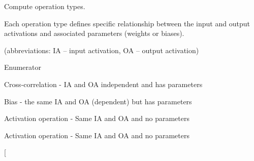 Compute operation types. 

Each operation type defines specific relationship between the input and output activations and associated parameters (weights or biases).\par
 (abbreviations\-: I\-A – input activation, O\-A – output activation) \begin{Desc}
\item[Enumerator]\par
\begin{description}
\item[{\em 
\hypertarget{namespaceMLSL_a1366e5621278eafc7ecb03de012824bfa70295c28704cb7c887a072686c4f5305}{O\-T\-\_\-\-C\-C}\label{namespaceMLSL_a1366e5621278eafc7ecb03de012824bfa70295c28704cb7c887a072686c4f5305}
}]Cross-\/correlation -\/ I\-A and O\-A independent and has parameters \item[{\em 
\hypertarget{namespaceMLSL_a1366e5621278eafc7ecb03de012824bfa49a50543b1b277ebfac7e22f02608ad2}{O\-T\-\_\-\-B\-I\-A\-S}\label{namespaceMLSL_a1366e5621278eafc7ecb03de012824bfa49a50543b1b277ebfac7e22f02608ad2}
}]Bias -\/ the same I\-A and O\-A (dependent) but has parameters \item[{\em 
\hypertarget{namespaceMLSL_a1366e5621278eafc7ecb03de012824bfa7eac245be19cf57e6395510671ebba1a}{O\-T\-\_\-\-A\-C\-T}\label{namespaceMLSL_a1366e5621278eafc7ecb03de012824bfa7eac245be19cf57e6395510671ebba1a}
}]Activation operation -\/ Same I\-A and O\-A and no parameters \item[{\em 
\hypertarget{namespaceMLSL_a1366e5621278eafc7ecb03de012824bfa6c34e19d18d2aca59c17031314d07208}{O\-T\-\_\-\-P\-O\-O\-L}\label{namespaceMLSL_a1366e5621278eafc7ecb03de012824bfa6c34e19d18d2aca59c17031314d07208}
}]Activation operation -\/ Same I\-A and O\-A and no parameters \item[{\em 
}
\end{description}
\end{Desc}
